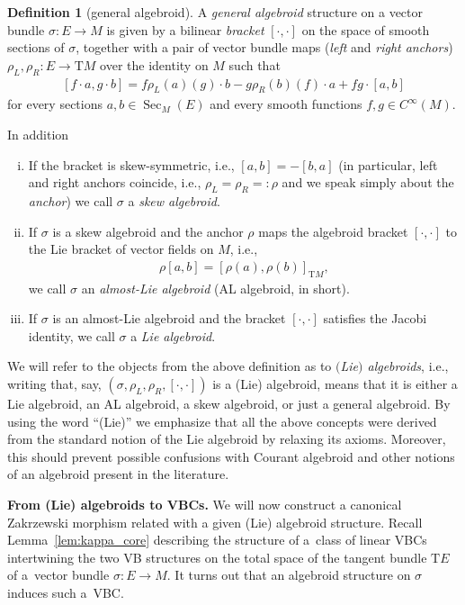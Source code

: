 \documentclass[pdftex]{sigma}
\newcommand{\ZM}{{VBC}} %
\newcommand{\Sec}{\operatorname{Sec}}
\newcommand{\ra}{\rightarrow}
\newcommand{\rhoL}{\rho_L} %
\newcommand{\rhoR}{\rho_R}
\newcommand{\T}{\mathrm{T}} %
\numberwithin{equation}{section}
\theoremstyle{definition}
\newtheorem{df}[thm]{Definition}
\begin{document}
\begin{df}[general algebroid]\label{def:algebroid}
A \emph{general algebroid} structure on a vector bundle \mbox{$\sigma\colon E\!\ra\! M$} is given by a bilinear \emph{bracket} $[\cdot,\cdot]$ on the space of smooth sections of $\sigma$, together with a pair of vector bundle maps (\emph{left} and \emph{right anchors}) $\rhoL,\rhoR\colon E\ra \T M$ over the identity on $M$ such that
\begin{gather}\label{eqn:bracket}
[f\cdot a,g\cdot b]=f\rhoL(a)(g)\cdot b-g\rhoR(b)(f)\cdot a+fg\cdot[a,b]
\end{gather}
for every sections $a,b\in\Sec_M(E)$ and every smooth functions $f,g\in C^\infty(M)$.

In addition
\begin{enumerate}[(i)]\itemsep=0pt
\item\label{cond:skew} If the bracket is skew-symmetric, i.e., $[a,b]=-[b,a]$ (in particular, left and right anchors coincide, i.e., $\rhoL=\rhoR=:\rho$ and we speak simply about the \emph{anchor}) we call $\sigma$ a \emph{skew algebroid}.
\item\label{cond:al} If $\sigma$ is a skew algebroid and the anchor $\rho$ maps the algebroid bracket $[\cdot,\cdot]$ to the Lie bracket of vector fields on $M$, i.e.,
\begin{gather}
\label{eqn:al_algebroid}
\rho[a,b]=[\rho(a),\rho(b)]_{\T M} ,
\end{gather}
we call $\sigma$ an \emph{almost-Lie algebroid} (AL algebroid, in short).
\item\label{cond:lie} If $\sigma$ is an almost-Lie algebroid and the bracket $[\cdot,\cdot]$ satisfies the Jacobi identity, we call $\sigma$ a \emph{Lie algebroid}.
\end{enumerate}
\end{df}

 We will refer to the objects from the above definition as to \emph{$($Lie$)$ algebroids}, i.e., writing that, say, $(\sigma,\rhoL,\rhoR,[\cdot,\cdot])$ is a (Lie) algebroid, means that it is either a Lie algebroid, an AL algebroid, a skew algebroid, or just a general algebroid. By using the word ``(Lie)'' we emphasize that all the above concepts were derived from the standard notion of the Lie algebroid by relaxing its axioms. Moreover, this should prevent possible confusions with Courant algebroid and other notions of an algebroid present in the literature.

{\bf From (Lie) algebroids to \ZM s.} We will now construct a canonical Zakrzewski morphism related with a given (Lie) algebroid structure. Recall Lemma~\ref{lem:kappa_core} describing the structure of a~class of linear \ZM s intertwining the two VB structures on the total space of the tangent bundle $\T E$ of a~vector bundle $\sigma\colon E\ra M$. It turns out that an algebroid structure on $\sigma$ induces such a~\ZM .
\end{document}
